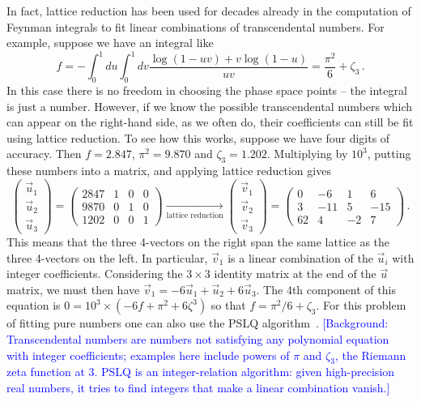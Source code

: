 \documentclass[a4paper,11pt]{article}
\begin{document}
In fact, lattice reduction has been used for decades already in the computation of Feynman integrals to fit linear combinations of transcendental numbers. 
For example, suppose we have an integral like
\begin{equation}
f=   - \int _0^1 du \int _0^1 dv \frac{\log (1-u v)+v \log (1-u)}{u v} = \frac{\pi^2}{6} +\zeta_3 \,.
\label{fnums}
\end{equation}
In this case there is no freedom in choosing the phase space points -- the integral is just a number. However, if we know the possible transcendental numbers which can appear on the right-hand side, as we often do, their coefficients can still be fit using lattice reduction. 
To see how this works, suppose we have four digits of accuracy. Then $f=2.847$, $\pi^2 = 9.870$ and $\zeta_3 = 1.202$. Multiplying by $10^3$, putting these numbers into a matrix, and applying lattice reduction gives
\begin{equation}
  \left(\begin{array}{c}
    \vec{u}_1\\
    \vec{u}_2\\
    \vec{u}_3
  \end{array}\right) = \left(\begin{array}{cccc}
    2847 & 1 & 0 & 0 \\
    9870 &0 & 1 & 0\\
    1202 &0 & 0 & 1
  \end{array}\right) \xrightarrow[\text{lattice reduction}]{}
  \left(\begin{array}{c}
    \vec{v}_1\\
    \vec{v}_2\\
    \vec{v}_3
  \end{array}\right) = \left(\begin{array}{cccc}
    0 & - 6 & 1 & 6\\
    3 & - 11 & 5 & - 15 \\
    62 & 4 & - 2 & 7 
  \end{array}\right) \,.
  \label{eq:llexample}
\end{equation}
This means that the three 4-vectors on the right span the same lattice as the three 4-vectors on the left. In particular, $\vec{v}_1$ is a linear combination of the $\vec{u}_i$ with integer coefficients. Considering the $3 \times 3$ identity matrix at the end of the $\vec{u}$ matrix, we must then have
$\vec{v}_1 = - 6 \vec{u}_1 + \vec{u}_2 + 6 \vec{u}_3$. The 4th component of this equation is $0 = 10^3 \times (- 6 f + \pi^2 + 6 \zeta^3)$ so that $f = \pi^2/6 + \zeta_3$. 
For this problem of fitting pure numbers one can also use the PSLQ algorithm~\cite{Ferguson:1992,PSLQref,Bailey:1999nv}. 
\textcolor{blue}{\small [Background: Transcendental numbers are numbers not satisfying any polynomial equation with integer coefficients; examples here include powers of $\pi$ and $\zeta_3$, the Riemann zeta function at 3. PSLQ is an integer-relation algorithm: given high-precision real numbers, it tries to find integers that make a linear combination vanish.]}
\end{document}

